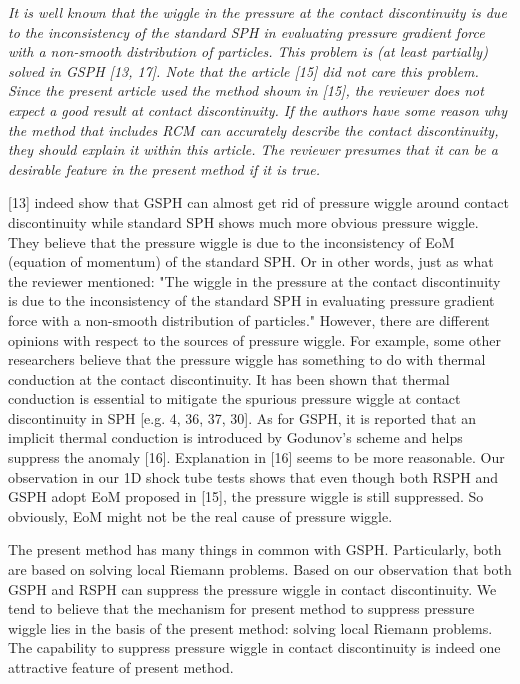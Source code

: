 \documentclass[10pt,a4paper]{article}
\begin{document}
\textit {It is well known that the wiggle in the pressure at the contact discontinuity is due to the inconsistency of the standard SPH in evaluating pressure gradient force with a non-smooth distribution of particles. This problem is (at least partially) solved in GSPH [13, 17]. Note that the article [15] did not care this problem. Since the present article used the method shown in [15], the reviewer does not expect a good result at contact discontinuity. If the authors have some reason why the method that includes RCM can accurately describe the contact discontinuity, they should explain it within this article. The reviewer
presumes that it can be a desirable feature in the present method if it is true.}

[13] indeed show that GSPH can almost get rid of pressure wiggle around contact discontinuity while standard SPH shows much more obvious pressure wiggle. They believe that the pressure wiggle is due to the inconsistency of EoM (equation of momentum) of the standard SPH. Or in other words, just as what the reviewer mentioned: "The wiggle in the pressure at the contact discontinuity is due to the inconsistency of the standard SPH in evaluating pressure gradient force with a non-smooth distribution of particles." However, there are different opinions with respect to the sources of pressure wiggle. For example, some other researchers believe that the pressure wiggle has something to do with thermal conduction at the contact discontinuity. It has been shown that thermal conduction is essential to mitigate the spurious pressure wiggle at contact discontinuity in SPH [e.g. 4, 36, 37, 30]. As for GSPH, it is reported that an implicit thermal conduction is introduced by Godunov's scheme and helps suppress the anomaly [16]. Explanation in [16] seems to be more reasonable. Our observation in our 1D shock tube tests shows that even though both RSPH and GSPH adopt EoM proposed in [15], the pressure wiggle is still suppressed. So obviously, EoM might not be the real cause of pressure wiggle. 

The present method has many things in common with GSPH. Particularly, both are based on solving local Riemann problems. Based on our observation that both GSPH and RSPH can suppress the pressure wiggle in contact discontinuity. We tend to believe that the mechanism for present method to suppress pressure wiggle lies in the basis of the present method: solving local Riemann problems. 
The capability to suppress pressure wiggle in contact discontinuity is indeed one attractive feature of present method.
\end{document}

